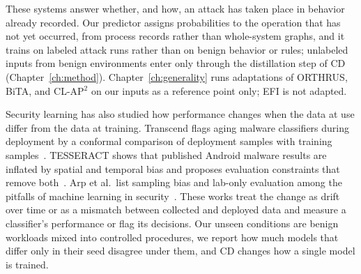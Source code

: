 These systems answer whether, and how, an attack has taken place in
behavior already recorded. Our predictor assigns probabilities to the
operation that has not yet occurred, from process records rather than
whole-system graphs, and it trains on labeled attack runs rather than
on benign behavior or rules; unlabeled inputs from benign environments
enter only through the distillation step of CD
(Chapter~\ref{ch:method}). Chapter~\ref{ch:generality}
runs adaptations of ORTHRUS, BiTA, and CL-AP$^{2}$ on our inputs as a
reference point only; EFI is not adapted.

Security learning has also studied how performance changes when the
data at use differ from the data at training. Transcend flags
aging malware classifiers during deployment by a conformal comparison
of deployment samples with training samples~\cite{jordaney2017transcend}.
TESSERACT shows that published Android malware results are inflated by
spatial and temporal bias and proposes evaluation constraints that
remove both~\cite{pendlebury2019tesseract}.
Arp et al.\ list sampling bias and lab-only evaluation among the
pitfalls of machine learning in security~\cite{arp2020dos}.
These works treat the change as drift over time or as a mismatch
between collected and deployed data and measure a classifier's
performance or flag its decisions. Our unseen conditions are benign
workloads mixed into controlled procedures, we report how much models
that differ only in their seed disagree under them, and CD changes how
a single model is trained.
